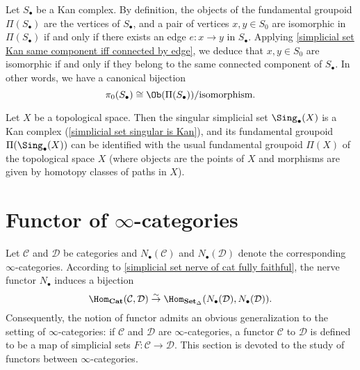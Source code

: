 \begin{remark}
Let $S_\bullet$ be a Kan complex. By definition, the objects of the fundamental groupoid $\Pi(S_\bullet)$ are the vertices of $S_\bullet$, and a pair of vertices $x,y\in S_0$ are isomorphic in $\Pi(S_\bullet)$ if and only if there exists an edge $e:x\to y$ in $S_\bullet$. Applying \cref{simplicial set Kan same component iff connected by edge}, we deduce that $x,y\in S_0$ are isomorphic if and only if they belong to the same connected component of $S_\bullet$. In other words, we have a canonical bijection
\[\pi_0(S_\bullet)\cong\Ob(\Pi(S_\bullet))/\text{isomorphism}.\]
\end{remark}
\begin{example}
Let $X$ be a topological space. Then the singular simplicial set $\Sing_\bullet(X)$ is a Kan complex (\cref{simplicial set singular is Kan}), and its fundamental groupoid $\Pi(\Sing_\bullet(X))$ can be identified with the usual fundamental groupoid $\Pi(X)$ of the topological space $X$ (where objects are the points of $X$ and morphisms are given by homotopy classes of paths in $X$).
\end{example}
\section{Functor of \texorpdfstring{$\infty$}{inf}-categories}
Let $\mathcal{C}$ and $\mathcal{D}$ be categories and $N_\bullet(\mathcal{C})$ and $N_\bullet(\mathcal{D})$ denote the corresponding $\infty$-categories. According to \cref{simplicial set nerve of cat fully faithful}, the nerve functor $N_\bullet$ induces a bijection
\[\Hom_{\mathbf{Cat}}(\mathcal{C},\mathcal{D})\stackrel{\sim}{\to}\Hom_{\mathbf{Set}_\Delta}(N_\bullet(\mathcal{D}),N_\bullet(\mathcal{D})).\]
Consequently, the notion of functor admits an obvious generalization to the setting of $\infty$-categories: if $\mathcal{C}$ and $\mathcal{D}$ are $\infty$-categories, a functor $\mathcal{C}$ to $\mathcal{D}$ is defined to be a map of simplicial sets $F:\mathcal{C}\to\mathcal{D}$. This section is devoted to the study of functors between $\infty$-categories.
